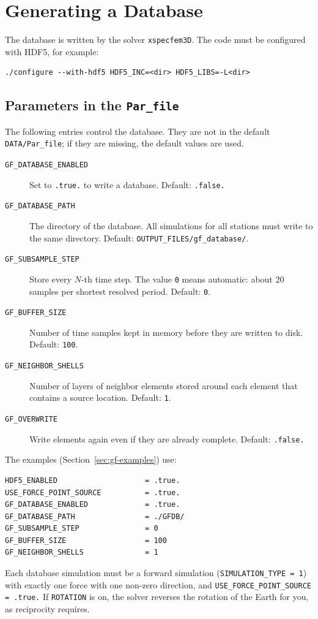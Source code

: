\section{Generating a Database}\label{sec:gf-generate}

The database is written by the solver \texttt{xspecfem3D}. The code must be
configured with HDF5, for example:
\begin{verbatim}
./configure --with-hdf5 HDF5_INC=<dir> HDF5_LIBS=-L<dir>
\end{verbatim}

\subsection{Parameters in the \texttt{Par\_file}}

The following entries control the database. They are not in the default
\texttt{DATA/Par\_file}; if they are missing, the default values are used.
\begin{description}
\item[\texttt{GF\_DATABASE\_ENABLED}] Set to \texttt{.true.} to write a database.
  Default: \texttt{.false.}
\item[\texttt{GF\_DATABASE\_PATH}] The directory of the database. All simulations
  for all stations must write to the same directory.
  Default: \texttt{OUTPUT\_FILES/gf\_database/}.
\item[\texttt{GF\_SUBSAMPLE\_STEP}] Store every $N$-th time step. The value
  \texttt{0} means automatic: about 20 samples per shortest resolved period.
  Default: \texttt{0}.
\item[\texttt{GF\_BUFFER\_SIZE}] Number of time samples kept in memory before
  they are written to disk. Default: \texttt{100}.
\item[\texttt{GF\_NEIGHBOR\_SHELLS}] Number of layers of neighbor elements
  stored around each element that contains a source location. Default: \texttt{1}.
\item[\texttt{GF\_OVERWRITE}] Write elements again even if they are already
  complete. Default: \texttt{.false.}
\end{description}
The examples (Section~\ref{sec:gf-examples}) use:
\begin{verbatim}
HDF5_ENABLED                    = .true.
USE_FORCE_POINT_SOURCE          = .true.
GF_DATABASE_ENABLED             = .true.
GF_DATABASE_PATH                = ./GFDB/
GF_SUBSAMPLE_STEP               = 0
GF_BUFFER_SIZE                  = 100
GF_NEIGHBOR_SHELLS              = 1
\end{verbatim}
Each database simulation must be a forward simulation
(\texttt{SIMULATION\_TYPE = 1}) with exactly one force with one non-zero
direction, and \texttt{USE\_FORCE\_POINT\_SOURCE = .true.} If \texttt{ROTATION} is on, the solver reverses the
rotation of the Earth for you, as reciprocity requires.

